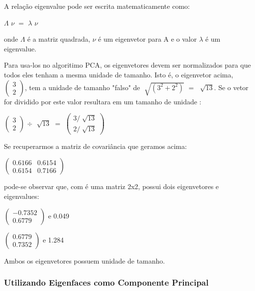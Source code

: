 A relação eigenvalue pode ser escrita matematicamente como: 

 $\Lambda$ $\nu$  $=$  $\lambda$ $\nu$  

onde $\Lambda$ é a matriz quadrada, $\nu$ é um eigenvetor para A e o valor $\lambda$ é um eigenvalue.

Para usa-los no algoritimo PCA, os eigenvetores devem ser normalizados para que todos eles tenham a mesma unidade de tamanho. Isto é, o eigenvetor acima, $\begin{pmatrix} 3 \\ 2\end{pmatrix}$, tem a unidade de tamanho "falso"  de  $\sqrt[]{(3^2 + 2^2)}$ $=$ $\sqrt[]{13}$. Se o vetor for dividido por este valor resultara em um tamanho de unidade \cite{drmathew_java_programming}:

\begin{center}
	$\begin{pmatrix} 3 \\ 2 \end{pmatrix}$ 
	$\div$  
	$\sqrt[]{13}$ $=$ 
	$\begin{pmatrix} 3 / \sqrt[]{13} \\ 2/\sqrt[]{13} \end{pmatrix}$
\end{center}

Se recuperarmos a matriz de covariância que geramos acima:

\begin{center}
	$\begin{pmatrix} 0.6166 & 0.6154 \\ 0.6154 & 0.7166 \end{pmatrix}$
\end{center}

pode-se observar que, com é uma matriz 2x2, possui dois eigenvetores e eigenvalues:

\begin{center}
$\begin{pmatrix} -0.7352 \\ 0.6779 \end{pmatrix}$  e 0.049

$\begin{pmatrix} 0.6779 \\ 0.7352 \end{pmatrix}$  e 1.284
\end{center}

Ambos os eigenvetores possuem unidade de tamanho.

\subsubsection{Utilizando Eigenfaces como Componente Principal}\label{subsec:eigenacp}

